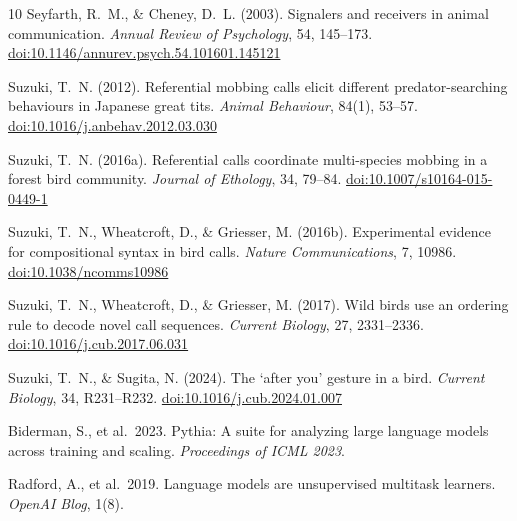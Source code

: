 \documentclass[12pt]{article}
\begin{document}
\begin{thebibliography}{10}
Seyfarth, R.~M., \& Cheney, D.~L. (2003).
Signalers and receivers in animal communication.
\textit{Annual Review of Psychology}, 54, 145--173.
\href{https://doi.org/10.1146/annurev.psych.54.101601.145121}{doi:10.1146/annurev.psych.54.101601.145121}

Suzuki, T.~N. (2012).
Referential mobbing calls elicit different predator-searching behaviours
in Japanese great tits.
\textit{Animal Behaviour}, 84(1), 53--57.
\href{https://doi.org/10.1016/j.anbehav.2012.03.030}{doi:10.1016/j.anbehav.2012.03.030}

Suzuki, T.~N. (2016a).
Referential calls coordinate multi-species mobbing
in a forest bird community.
\textit{Journal of Ethology}, 34, 79--84.
\href{https://doi.org/10.1007/s10164-015-0449-1}{doi:10.1007/s10164-015-0449-1}

Suzuki, T.~N., Wheatcroft, D., \& Griesser, M. (2016b).
Experimental evidence for compositional syntax in bird calls.
\textit{Nature Communications}, 7, 10986.
\href{https://doi.org/10.1038/ncomms10986}{doi:10.1038/ncomms10986}

Suzuki, T.~N., Wheatcroft, D., \& Griesser, M. (2017).
Wild birds use an ordering rule to decode novel call sequences.
\textit{Current Biology}, 27, 2331--2336.
\href{https://doi.org/10.1016/j.cub.2017.06.031}{doi:10.1016/j.cub.2017.06.031}

Suzuki, T.~N., \& Sugita, N. (2024).
The `after you' gesture in a bird.
\textit{Current Biology}, 34, R231--R232.
\href{https://doi.org/10.1016/j.cub.2024.01.007}{doi:10.1016/j.cub.2024.01.007}

Biderman, S., et al.\ 2023.
Pythia: A suite for analyzing large language models across training and scaling.
\textit{Proceedings of ICML 2023}.

Radford, A., et al.\ 2019.
Language models are unsupervised multitask learners.
\textit{OpenAI Blog}, 1(8).

\end{thebibliography}
\end{document}
